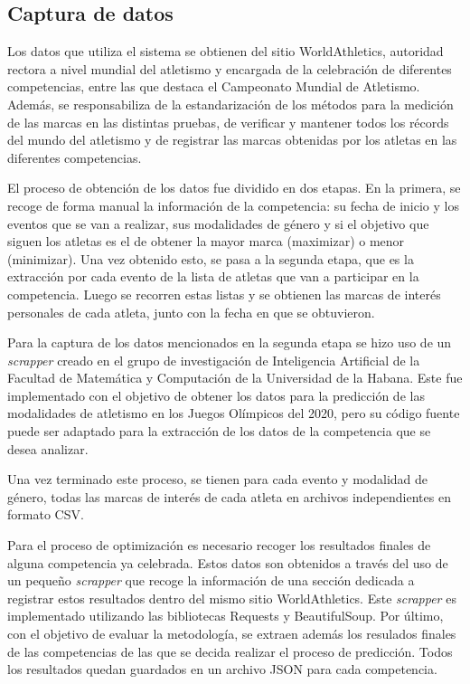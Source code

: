\subsection{Captura de datos}\label{section:capdatos}

Los datos que utiliza el sistema se obtienen del sitio WorldAthletics, autoridad rectora a nivel mundial del atletismo y encargada de la celebración de diferentes competencias, entre las que destaca el Campeonato Mundial de Atletismo. Además, se responsabiliza de la estandarización de los métodos para la medición de las marcas en las distintas pruebas, de verificar y mantener todos los récords del mundo del atletismo y de registrar las marcas obtenidas por los atletas en las diferentes competencias. 

El proceso de obtención de los datos fue dividido en dos etapas. En la primera, se recoge de forma manual la información de la competencia: su fecha de inicio y los eventos que se van a realizar, sus modalidades de género y si el objetivo que siguen los atletas es el de obtener la mayor marca (maximizar) o menor (minimizar). Una vez obtenido esto, se pasa a la segunda etapa, que es la extracción por cada evento de la lista de atletas que van a participar en la competencia. Luego se recorren estas listas y se obtienen las marcas de interés personales de cada atleta, junto con la fecha en que se obtuvieron. 

Para la captura de los datos mencionados en la segunda etapa se hizo uso de un \textit{scrapper} creado en el grupo de investigación de Inteligencia Artificial de la Facultad de Matemática y Computación de la Universidad de la Habana. Este fue implementado con el objetivo de obtener los datos para la predicción de las modalidades de atletismo en los Juegos Olímpicos del 2020, pero su código fuente puede ser adaptado para la extracción de los datos de la competencia que se desea analizar.

Una vez terminado este proceso, se tienen para cada evento y modalidad de género, todas las marcas de interés de cada atleta en archivos independientes en formato CSV.

Para el proceso de optimización es necesario recoger los resultados finales de alguna competencia ya celebrada. Estos datos son obtenidos a través del uso de un pequeño \textit{scrapper} que recoge la información de una sección dedicada a registrar estos resultados dentro del mismo sitio WorldAthletics. Este \textit{scrapper} es implementado utilizando las bibliotecas Requests y BeautifulSoup. Por último, con el objetivo de evaluar la metodología, se extraen además los resulados finales de las competencias de las que se decida realizar el proceso de predicción. Todos los resultados quedan guardados en un archivo JSON para cada competencia. 

